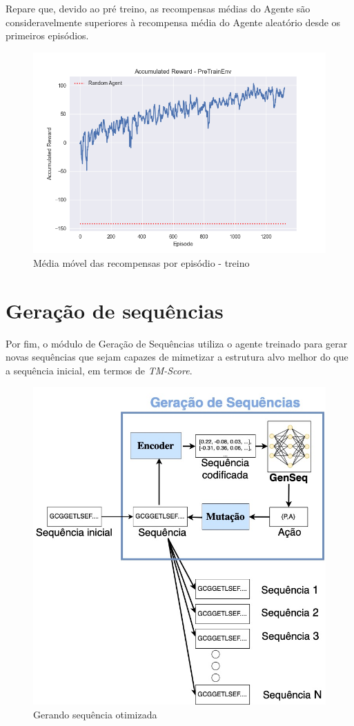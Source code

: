  Repare que, devido ao pré treino, as recompensas médias do Agente são consideravelmente superiores
  à recompensa média do Agente aleatório desde os primeiros episódios. 
  \begin{figure}[H]
    \centering
    \includegraphics[width=.8\linewidth]{figuras/plot_train_reward.jpg}    
    \caption{Média móvel das recompensas por episódio - treino}
    \label{fig:rew_per_ep_train}
  \end{figure}
  

\section{Geração de sequências}
Por fim, o módulo de Geração de Sequências utiliza o agente treinado para gerar novas sequências que sejam capazes de mimetizar a estrutura alvo melhor do que a sequência inicial, em termos de \textit{TM-Score}.  
\begin{figure}[H]
  \centering
  \includegraphics[width=.8\textwidth]{figuras/metodologia-Generating.jpg}
  \caption{Gerando sequência otimizada}
\end{figure}
